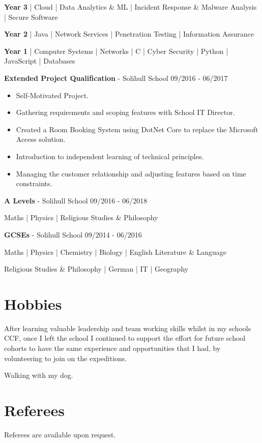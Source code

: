 \documentclass{article}
\begin{document}
\begin{center}
	\textbf{Year 3} | Cloud | Data Analytics \& ML | Incident Response \& Malware Analysis | Secure Software

	\textbf{Year 2} | Java | Network Services | Penetration Testing | Information Assurance

	\textbf{Year 1} | Computer Systems | Networks | C | Cyber Security | Python | JavaScript | Databases
\end{center}

\textbf{Extended Project Qualification} - Solihull School \hfill 09/2016 - 06/2017

\begin{multicols}{2}
\begin{itemize}
\itemsep0em
	\item Self-Motivated Project.
	\item Gathering requirements and scoping features with School IT Director.
	\item Created a Room Booking System using DotNet Core to replace the Microsoft Access solution.
	\item Introduction to independent learning of technical principles.
	\item Managing the customer relationship and adjusting features based on time constraints.
\end{itemize}
\end{multicols}

\textbf{A Levels} - Solihull School \hfill 09/2016 - 06/2018

\begin{center}
Maths | Physics | Religious Studies \& Philosophy
\end{center}

\textbf{GCSEs} - Solihull School \hfill 09/2014 - 06/2016

\begin{center}
Maths | Physics | Chemistry | Biology | English Literature \& Language

Religious Studies \& Philosophy | German | IT | Geography
\end{center}

\section*{Hobbies}

After learning valuable leadership and team working skills whilst in my schools CCF, once I left the school I continued to support the effort for future school cohorts to have the same experience and opportunities that I had, by volunteering to join on the expeditions.

Walking with my dog.

\section*{Referees}

Referees are available upon request.
\end{document}
